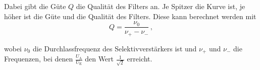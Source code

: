 \noindent
Dabei gibt die Güte $Q$ die Qualität des Filters an. Je Spitzer die Kurve ist, je höher ist die Güte und die Qualität des Filters. Diese kann berechnet werden mit 
\begin{equation}
        \label{eqn:guete}
        Q = \frac{\nu_0}{\nu_+ - \nu_-} \, ,
\end{equation}

\noindent
wobei $\nu_0$ die Durchlassfrequenz des Selektivverstärkers ist und $\nu_+$ und $\nu_-$ die Frequenzen, bei denen $\frac{U_\text{A}}{U_\text{E}}$ den Wert $\frac{1}{\sqrt{2}}$ erreicht.

